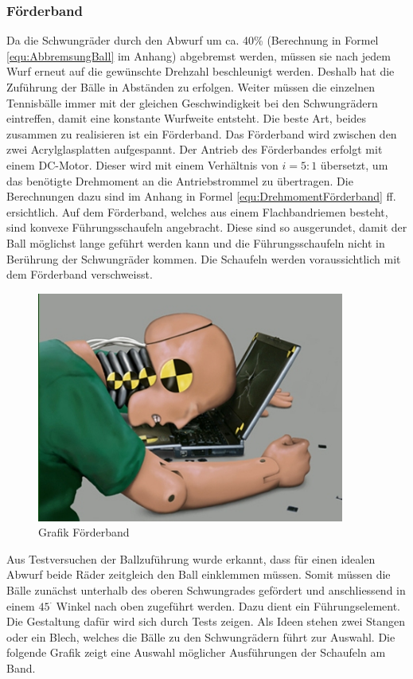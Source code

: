 \subsubsection{Förderband}
Da die Schwungräder durch den Abwurf um ca. 40\% (Berechnung in Formel \ref{equ:AbbremsungBall} im Anhang) abgebremst werden, müssen sie nach jedem Wurf erneut auf die gewünschte Drehzahl beschleunigt werden. Deshalb hat die Zuführung der Bälle in Abständen zu erfolgen. Weiter müssen die einzelnen Tennisbälle immer mit der gleichen Geschwindigkeit bei den Schwungrädern eintreffen, damit eine konstante Wurfweite entsteht. Die beste Art, beides zusammen zu realisieren ist ein Förderband. Das Förderband wird zwischen den zwei Acrylglasplatten aufgespannt. Der Antrieb des Förderbandes erfolgt mit einem DC-Motor. Dieser wird mit einem Verhältnis von $i=5:1$ übersetzt, um das benötigte Drehmoment an die Antriebstrommel zu übertragen. Die Berechnungen dazu sind im Anhang in Formel \ref{equ:DrehmomentFörderband} ff. ersichtlich. Auf dem Förderband, welches aus einem Flachbandriemen besteht, sind konvexe Führungsschaufeln angebracht. Diese sind so ausgerundet, damit der Ball möglichst lange geführt werden kann und die Führungsschaufeln nicht in Berührung der Schwungräder kommen. Die Schaufeln werden voraussichtlich mit dem Förderband verschweisst.
\newpage
\begin{figure} [h!]
	\centering
	\includegraphics[width=0.9\textwidth]{Enddokumentation/CrashTestDummy.jpg}
	\caption{Grafik Förderband}
	\label{fig:Grafik Förderband}	
\end{figure}
Aus Testversuchen der Ballzuführung wurde erkannt, dass für einen idealen Abwurf beide Räder zeitgleich den Ball einklemmen müssen. Somit müssen die Bälle zunächst unterhalb des oberen Schwungrades gefördert und anschliessend in einem $45^\cdot$ Winkel nach oben zugeführt werden. Dazu dient ein Führungselement. Die Gestaltung dafür wird sich durch Tests zeigen. Als Ideen stehen zwei Stangen oder ein Blech, welches die Bälle zu den Schwungrädern führt zur Auswahl. Die folgende Grafik zeigt eine Auswahl möglicher Ausführungen der Schaufeln am Band.
